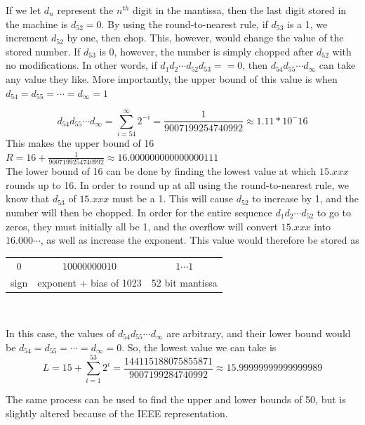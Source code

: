 	If we let $d_n$ represent the $n^{th}$ digit in the mantissa, then the last digit stored in the machine is $d_{52}=0$. By using
	the round-to-nearest rule, if $d_{53}$ is a 1, we increment $d_{52}$ by one, then chop. This, however, would change the value of the
	stored number. If $d_{53}$ is 0, however, the number is simply chopped after $d_{52}$ with no modifications. In other words, if
	$d_1 d_2 \cdots d_{52} d_{53} ==  0$, then $d_{54} d_{55} \cdots d_{\infty}$ can take any value they like. More importantly, the
	upper bound of this value is when $d_{54} = d_{55} = \cdots = d_{\infty} = 1$

	$$d_{54} d_{55} \cdots d_{\infty} = \sum_{i=54}^{\infty}2^{-i} = \frac{1}{9007199254740992} \approx 1.11*10^-16$$
	This makes the upper bound of 16 $R=16+\frac{1}{9007199254740992} \approx 16.000000000000000111$ \\

	The lower bound of 16 can be done by finding the lowest value at which $15.xxx$ rounds up to 16. In order to round up at all using
	the round-to-nearest rule, we know that $d_{53}$ of $15.xxx$ must be a 1. This will cause $d_{52}$ to increase by 1, and the number
	will then be chopped. In order for the entire sequence $d_1 d_2 \cdots d_{52}$ to go to zeros, they must initially all be 1, and the
	overflow will convert $15.xxx$ into $16.000\cdots$, as well as increase the exponent.
	This value would therefore be stored as \\

	\begin{center}
	\begin{tabular}{c | c | c}

		$0$ & $10000000010$ & $1\cdots1$ \\

		sign & exponent + bias of 1023 & 52 bit mantissa \\

	\end{tabular} \\
	\end{center}

	In this case, the values of $d_{54} d_{55}
	\cdots d_{\infty}$ are arbitrary, and their lower bound would be $d_{54} = d_{55} = \cdots = d_{\infty} = 0$. So, the lowest value we
	can take is
	$$L=15+\sum_{i=1}^{53}2^i = \frac{144115188075855871}{9007199284740992} \approx 15.99999999999999989$$

	\item The same process can be used to find the upper and lower bounds of 50, but is slightly altered because of the IEEE
	representation.

